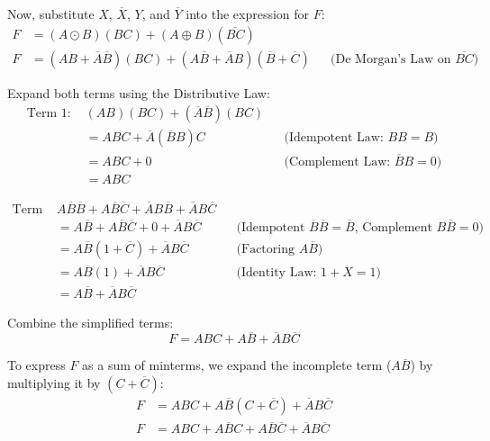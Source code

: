 \documentclass[12pt,a3paper]{article}
\begin{document}
\begin{enumerate}
\begin{tcolorbox}[enhanced,breakable,ansbox,colback=cA!4,colframe=cA,boxrule=0.8pt,arc=5pt,title={\textbf{Answer}},fonttitle=\bfseries\color{white},colbacktitle=cA]
Now, substitute $X$, $\overline{X}$, $Y$, and $\overline{Y}$ into the expression for $F$:
\begin{align*}
    F &= (A \odot B)(BC) + (A \oplus B)(\overline{BC}) \\
    F &= (AB + \overline{A}\overline{B})(BC) + (A\overline{B} + \overline{A}B)(\overline{B} + \overline{C}) && \text{(De Morgan's Law on } \overline{BC} \text{)}
\end{align*}

Expand both terms using the Distributive Law:
\begin{align*}
    \text{Term 1: } & (AB)(BC) + (\overline{A}\overline{B})(BC) \\
    &= ABC + \overline{A}(\overline{B}B)C && \text{(Idempotent Law: } BB=B \text{)} \\
    &= ABC + 0 && \text{(Complement Law: } \overline{B}B=0 \text{)} \\
    &= ABC
\end{align*}

\begin{align*}
    \text{Term 2: } & A\overline{B}\overline{B} + A\overline{B}\overline{C} + \overline{A}B\overline{B} + \overline{A}B\overline{C} \\
    &= A\overline{B} + A\overline{B}\overline{C} + 0 + \overline{A}B\overline{C} && \text{(Idempotent } \overline{B}\overline{B}=\overline{B} \text{, Complement } B\overline{B}=0 \text{)} \\
    &= A\overline{B}(1 + \overline{C}) + \overline{A}B\overline{C} && \text{(Factoring } A\overline{B} \text{)} \\
    &= A\overline{B}(1) + \overline{A}B\overline{C} && \text{(Identity Law: } 1+X=1 \text{)} \\
    &= A\overline{B} + \overline{A}B\overline{C}
\end{align*}

Combine the simplified terms:
\begin{equation*}
    F = ABC + A\overline{B} + \overline{A}B\overline{C}
\end{equation*}

To express $F$ as a sum of minterms, we expand the incomplete term ($A\overline{B}$) by multiplying it by $(C + \overline{C})$:
\begin{align*}
    F &= ABC + A\overline{B}(C + \overline{C}) + \overline{A}B\overline{C} \\
    F &= ABC + A\overline{B}C + A\overline{B}\overline{C} + \overline{A}B\overline{C}
\end{align*}


\end{tcolorbox}
\end{enumerate}
\end{document}
